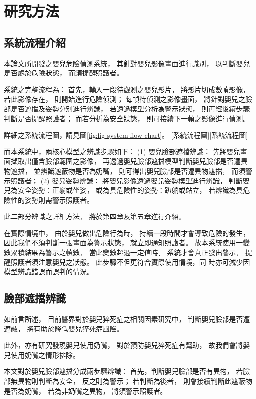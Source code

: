 \documentclass[class=NCU_thesis, crop=false]{standalone}
\begin{document}
\chapter{研究方法}

\section{系統流程介紹}
本論文所開發之嬰兒危險偵測系統，
其針對嬰兒影像畫面進行識別，
以判斷嬰兒是否處於危險狀態，
而須提醒照護者。

系統之完整流程為：
首先，輸入一段待觀測之嬰兒影片，
將影片切成數幀影像，
若此影像存在，
則開始進行危險偵測；
每幀待偵測之影像畫面，
將針對嬰兒之臉部是否遮擋及姿勢分別進行辨識，
若透過模型分析為警示狀態，
則再經後續步驟判斷是否提醒照護者；
而若分析為安全狀態，
則可接續下一幀之影像進行偵測。

詳細之系統流程圖，請見圖\cref{fig:fig-system-flow-chart}。
[系統流程圖][系統流程圖]

而本系統中，兩核心模型之辨識步驟如下：
(1) 嬰兒臉部遮擋辨識：
先將嬰兒畫面擷取出僅含臉部範圍之影像，
再透過嬰兒臉部遮擋模型判斷嬰兒臉部是否遭異物遮擋，
並辨識遮蔽物是否為奶嘴，
則可得出嬰兒臉部是否遭異物遮擋，
而須警示照護者；
(2) 嬰兒姿勢辨識：
將嬰兒影像透過嬰兒姿勢模型進行辨識，
判斷嬰兒為安全姿勢：正躺或坐姿，
或為具危險性的姿勢：趴躺或站立，
若辨識為具危險性的姿勢則需警示照護者。

此二部分辨識之詳細方法，
將於第四章及第五章進行介紹。

在實際情境中，
由於嬰兒做出危險行為時，
持續一段時間才會導致危險的發生，
因此我們不須判斷一張畫面為警示狀態，
就立即通知照護者。
故本系統使用一變數累積結果為警示之幀數，
當此變數超過一定值時，
系統才會真正發出警示，
提醒照護者須注意嬰兒之狀態。
此步驟不但更符合實際使用情境，同
時亦可減少因模型辨識錯誤而誤判的情況。

\section{臉部遮擋辨識}
如前言所述，
目前醫界對於嬰兒猝死症之相關因素研究中，
判斷嬰兒臉部是否遭遮蔽，
將有助於降低嬰兒猝死症風險。

此外，亦有研究發現嬰兒使用奶嘴，
對於預防嬰兒猝死症有幫助，
故我們會將嬰兒使用奶嘴之情形排除。

本文對於嬰兒臉部遮擋分成兩步驟辨識：
首先，判斷嬰兒臉部是否有異物，
若臉部無異物則判斷為安全，
反之則為警示；
若判斷為後者，
則會接續判斷此遮蔽物是否為奶嘴，
若為非奶嘴之異物，
將須警示照護者。
\end{document}
